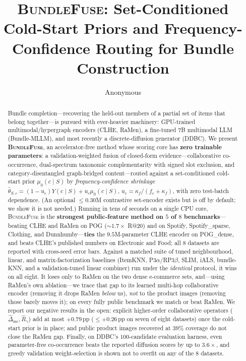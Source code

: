 \documentclass[10pt]{article}
\title{\textsc{BundleFuse}: Set-Conditioned Cold-Start Priors and Frequency-Confidence Routing for Bundle Construction}
\author{Anonymous}
\date{}
\begin{document}
\maketitle

\begin{abstract}
Bundle completion---recovering the held-out members of a partial set of items that belong together---is pursued with
ever-heavier machinery: GPU-trained multimodal/hypergraph encoders (CLHE, RaMen), a fine-tuned $7$B multimodal LLM
(Bundle-MLLM), and most recently a discrete-diffusion generator (DDBC). We present \textbf{\textsc{BundleFuse}}, an
accelerator-free method whose scoring core has \textbf{zero trainable parameters}: a validation-weighted fusion of
closed-form evidence---collaborative co-occurrence, dual-spectrum taxonomic complementarity with signed slot
exclusion, and category-disentangled graph-bridged content---routed against a set-conditioned cold-start prior
$\mu_0(c\mid S)$ by \emph{frequency-confidence shrinkage}
$\hat{\theta}_{S,c} = (1 - u_c)Y(c\mid S) + u_c\mu_0(c\mid S)$, $u_c = \kappa_f / (f_c + \kappa_f)$, with zero
test-batch dependence. (An optional ${\le}0.30$M contrastive set-encoder exists but is off by default; we show it is
not needed.) Running in tens of seconds on a single CPU core, \textsc{BundleFuse} is the \textbf{strongest
public-feature method on $5$ of $8$ benchmarks}---beating CLHE and RaMen on POG (${\sim}1.7\times$ R@20) and on
Spotify, Spotify\_sparse, Clothing, and Dunnhumby---\textbf{ties} the $9.5$M-parameter CLHE encoder on POG\_dense,
and beats CLHE's published numbers on Electronic and Food; all $8$ datasets are reported with cross-seed error bars.
Against a matched suite of tuned neighbourhood, linear, and matrix-factorization baselines (ItemKNN, P3$\alpha$/RP3$\beta$,
SLIM, iALS, bundle-KNN, and a validation-tuned linear combiner) run under the \emph{identical} protocol, it wins on all eight.
It loses only to RaMen on the two dense e-commerce sets, and---using RaMen's own ablation---we trace that gap to its
learned multi-hop collaborative encoder (removing it drops RaMen \emph{below} us), \emph{not} to the product images
(removing those barely moves it); on every fully public benchmark we match or beat RaMen. We report our
negative results in the open: explicit higher-order collaborative operators
($\hat{\Delta}_{\text{inc}}, \hat{R}_{\gamma}$) add at most $+0.79$\,pp (${\le}+0.26$\,pp on seven of eight datasets)
once the cold-start prior is in place;
and public product images recovered at $39\%$ coverage do not close the RaMen gap. Finally, on DDBC's $100$-candidate evaluation harness, even parameter-free
co-occurrence beats the reported diffusion scores by up to $3.6\times$, and greedy validation weight-selection is
shown not to overfit on any of the $8$ datasets.
\end{abstract}
\end{document}
